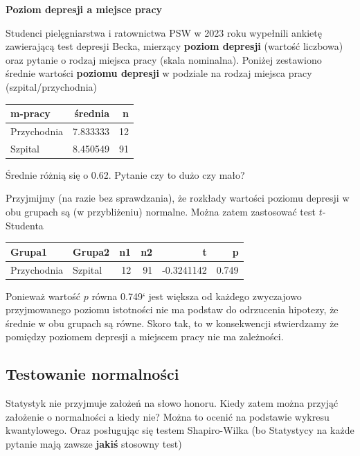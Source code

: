 \documentclass[
  openany]{book}
\begin{document}
\begin{example}
\textbf{Poziom depresji a miejsce pracy}

Studenci pielęgniarstwa i ratownictwa PSW w 2023 roku wypełnili
ankietę zawierającą
test depresji Becka, mierzący \textbf{poziom depresji} (wartość liczbowa)
oraz pytanie o rodzaj miejsca pracy (skala nominalna). Poniżej
zestawiono średnie wartości \textbf{poziomu depresji} w podziale
na rodzaj miejsca pracy (szpital/przychodnia)

\begin{tabular}{l|r|r}
\hline
m-pracy & średnia & n\\
\hline
Przychodnia & 7.833333 & 12\\
\hline
Szpital & 8.450549 & 91\\
\hline
\end{tabular}

Średnie różnią się
o 0.62.
Pytanie czy to dużo czy mało?

Przyjmijmy (na razie bez sprawdzania), że rozkłady wartości poziomu depresji
w obu grupach są (w przybliżeniu)
normalne. Można zatem zastosować test \(t\)-Studenta

\begin{tabular}{l|l|r|r|r|r}
\hline
Grupa1 & Grupa2 & n1 & n2 & t & p\\
\hline
Przychodnia & Szpital & 12 & 91 & -0.3241142 & 0.749\\
\hline
\end{tabular}

Ponieważ wartość \(p\) równa 0.749` jest większa od każdego zwyczajowo
przyjmowanego poziomu istotności nie ma podstaw
do odrzucenia hipotezy, że średnie w obu grupach są równe. Skoro tak, to
w konsekwencji stwierdzamy że pomiędzy poziomem depresji
a miejscem pracy nie ma zależności.
\end{example}

\hypertarget{testowanie-normalnoux15bci}{%
\subsection{Testowanie normalności}\label{testowanie-normalnoux15bci}}

Statystyk nie przyjmuje założeń na słowo honoru.
Kiedy zatem można przyjąć założenie o normalności a kiedy nie?
Można to ocenić na podstawie wykresu kwantylowego. Oraz
posługując się testem Shapiro-Wilka
(bo Statystycy na każde pytanie mają zawsze \textbf{jakiś} stosowny test)
\end{document}
